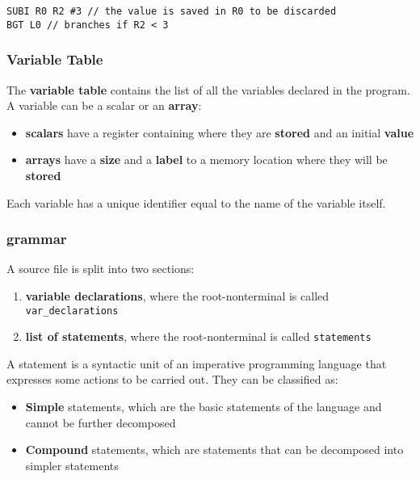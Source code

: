 \documentclass[english]{article}
\begin{document}
\begin{onepage}
  \begin{lstlisting}[caption={Conditional jump example}, label={code:conditional-jump}]
SUBI R0 R2 #3 // the value is saved in R0 to be discarded
BGT L0 // branches if R2 < 3
\end{lstlisting}
\end{onepage}

\subsubsection{Variable Table}

The \textbf{variable table} contains the list of all the variables declared in the program.
A variable can be a scalar or an \textbf{array}:

\begin{itemize}
  \item \textbf{scalars} have a register containing where they are \textbf{stored} and an initial \textbf{value}
  \item \textbf{arrays} have a \textbf{size} and a \textbf{label} to a memory location where they will be \textbf{stored}
\end{itemize}

Each variable has a unique identifier equal to the name of the variable itself.

\subsubsection{\lance grammar}

A \lance source file is split into two sections:

\begin{enumerate}
  \item \textbf{variable declarations}, where the root-nonterminal is called \texttt{var\_declarations}
  \item \textbf{list of statements}, where the root-nonterminal is called \texttt{statements}
\end{enumerate}

A statement is a syntactic unit of an imperative programming language that expresses some actions to be carried out.
They can be classified as:

\begin{itemize}
  \item \textbf{Simple} statements, which are the basic statements of the language and cannot be further decomposed
  \item \textbf{Compound} statements, which are statements that can be decomposed into simpler statements
\end{itemize}
\end{document}
